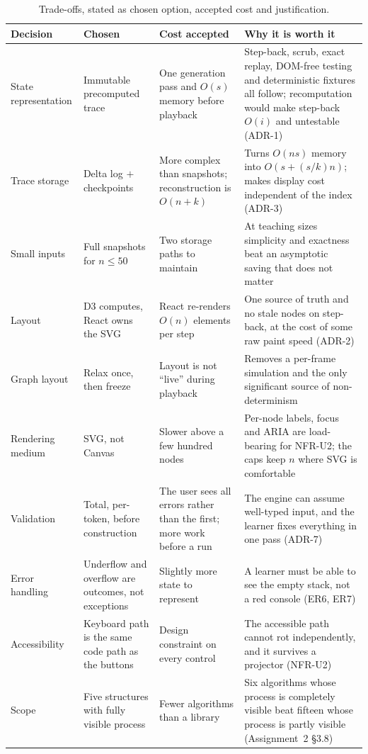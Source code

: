 \documentclass[11pt,a4paper]{article}
\begin{document}
\begin{table}[H]
\centering
\small
\setlength{\tabcolsep}{4pt}
\begin{tabular}{@{}L{3.0cm}L{3.2cm}L{3.0cm}L{5.4cm}@{}}
\toprule
\textbf{Decision} & \textbf{Chosen} & \textbf{Cost accepted} & \textbf{Why it is worth it} \\
\midrule
State representation & Immutable precomputed trace & One generation pass and $O(s)$ memory
before playback & Step-back, scrub, exact replay, DOM-free testing and deterministic fixtures
all follow; recomputation would make step-back $O(i)$ and untestable (ADR-1) \\
Trace storage & Delta log $+$ checkpoints & More complex than snapshots; reconstruction is
$O(n+k)$ & Turns $O(ns)$ memory into $O(s + (s/k)n)$; makes display cost independent of the
index (ADR-3) \\
Small inputs & Full snapshots for $n \le 50$ & Two storage paths to maintain & At teaching
sizes simplicity and exactness beat an asymptotic saving that does not matter \\
Layout & D3 computes, React owns the SVG & React re-renders $O(n)$ elements per step & One
source of truth and no stale nodes on step-back, at the cost of some raw paint speed
(ADR-2) \\
Graph layout & Relax once, then freeze & Layout is not ``live'' during playback & Removes a
per-frame simulation and the only significant source of non-determinism \\
Rendering medium & SVG, not Canvas & Slower above a few hundred nodes & Per-node labels,
focus and ARIA are load-bearing for NFR-U2; the caps keep $n$ where SVG is comfortable \\
Validation & Total, per-token, before construction & The user sees all errors rather than the
first; more work before a run & The engine can assume well-typed input, and the learner fixes
everything in one pass (ADR-7) \\
Error handling & Underflow and overflow are outcomes, not exceptions & Slightly more state
to represent & A learner must be able to see the empty stack, not a red console
(ER6, ER7) \\
Accessibility & Keyboard path is the same code path as the buttons & Design constraint on
every control & The accessible path cannot rot independently, and it survives a projector
(NFR-U2) \\
Scope & Five structures with fully visible process & Fewer algorithms than a library & Six
algorithms whose process is completely visible beat fifteen whose process is partly visible
(Assignment~2 \S3.8) \\
\bottomrule
\end{tabular}
\caption{Trade-offs, stated as chosen option, accepted cost and justification.}
\label{tab:tradeoffs}
\end{table}
\end{document}
